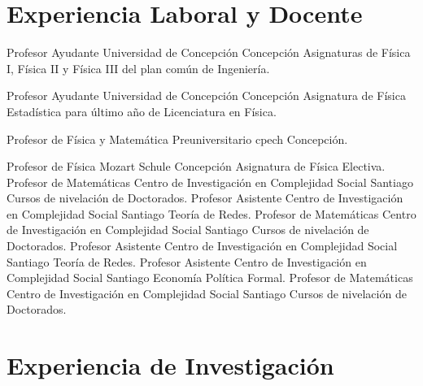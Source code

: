 \section{Experiencia Laboral y Docente}


        {Profesor Ayudante}
        {Universidad de Concepción}
        {Concepción} 
        {Asignaturas de Física I, Física II y Física III del plan común de Ingeniería.}   %
        {}

        {Profesor Ayudante}
        {Universidad de Concepción}
        {Concepción}
        {Asignatura de Física Estadística para último año de Licenciatura en Física.}  %
        {}


        {Profesor de Física y Matemática}
        {Preuniversitario cpech}
        {Concepción.}
        {}   %
        {}

        {Profesor de Física}
        {Mozart Schule}
        {Concepción}
        {Asignatura de Física Electiva.}   %
        {}
        {Profesor de Matemáticas}
        {Centro de Investigación en Complejidad Social}
        {Santiago}
        {Cursos de nivelación de Doctorados.}   %
        {}
        {Profesor Asistente}
        {Centro de Investigación en Complejidad Social}
        {Santiago}
        {Teoría de Redes.}   %
        {}
        {Profesor de Matemáticas}
        {Centro de Investigación en Complejidad Social}
        {Santiago}
        {Cursos de nivelación de Doctorados.}   %
        {}
        {Profesor Asistente}
        {Centro de Investigación en Complejidad Social}
        {Santiago}
        {Teoría de Redes.}   %
        {}
        {Profesor Asistente}
        {Centro de Investigación en Complejidad Social}
        {Santiago}
        {Economía Política Formal.}   %
        {}
        {Profesor de Matemáticas}
        {Centro de Investigación en Complejidad Social}
        {Santiago}
        {Cursos de nivelación de Doctorados.}   %
        {}


\section{Experiencia de Investigación}

